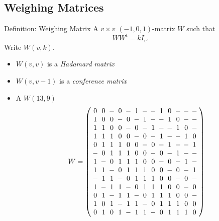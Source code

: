 \documentclass{beamer}
\begin{document}

\subsection{Weighing Matrices}

\begin{frame}

  \begin{block}{Definition: Weighing Matrix}
    A $v \times v$ $(-1,0,1)$-matrix $W$ such that
    \[
      WW^t = kI_v.
    \]
    Write $W(v,k)$.
  \end{block}

  \begin{itemize}
  \item $W(v,v)$ is a {\it Hadamard matrix}
  \item $W(v,v-1)$ is a {\it conference matrix}
  \end{itemize}

\end{frame}

\begin{frame}

  \begin{itemize}
  \item A $W(13,9)$
    \[
      W =
      \arraycolsep=2.0pt\def\arraystretch{1.0}
      \left(
        \begin{array}{ccccccccccccc}
          0&0&-&0&-&1&-&-&1&0&-&-&-\\
          1&0&0&-&0&-&1&-&-&1&0&-&-\\
          1&1&0&0&-&0&-&1&-&-&1&0&-\\
          1&1&1&0&0&-&0&-&1&-&-&1&0\\
          0&1&1&1&0&0&-&0&-&1&-&-&1\\
          -&0&1&1&1&0&0&-&0&-&1&-&-\\
          1&-&0&1&1&1&0&0&-&0&-&1&-\\
          1&1&-&0&1&1&1&0&0&-&0&-&1\\
          -&1&1&-&0&1&1&1&0&0&-&0&-\\
          1&-&1&1&-&0&1&1&1&0&0&-&0\\
          0&1&-&1&1&-&0&1&1&1&0&0&-\\
          1&0&1&-&1&1&-&0&1&1&1&0&0\\
          0&1&0&1&-&1&1&-&0&1&1&1&0\\
        \end{array}
      \right)
    \]
  \end{itemize}
  
\end{frame}
\end{document}
